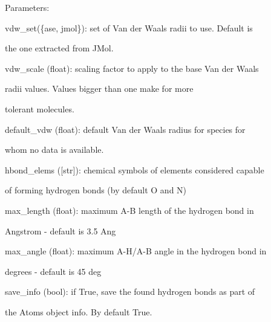 \documentclass[letterpaper,10pt,english]{sphinxmanual}
\begin{document}
\begin{fulllineitems}
\begin{DUlineblock}{0em}
\item[] Parameters:
\item[]
\begin{DUlineblock}{\DUlineblockindent}
\item[] vdw\_set(\{ase, jmol\}): set of Van der Waals radii to use. Default is
\item[]
\begin{DUlineblock}{\DUlineblockindent}
\item[] the one extracted from JMol.
\end{DUlineblock}
\item[] vdw\_scale (float): scaling factor to apply to the base Van der Waals
\item[]
\begin{DUlineblock}{\DUlineblockindent}
\item[] radii values. Values bigger than one make for more
\item[] tolerant molecules.
\end{DUlineblock}
\item[] default\_vdw (float): default Van der Waals radius for species for
\item[]
\begin{DUlineblock}{\DUlineblockindent}
\item[] whom no data is available.
\end{DUlineblock}
\item[] hbond\_elems ({[}str{]}): chemical symbols of elements considered capable
\item[]
\begin{DUlineblock}{\DUlineblockindent}
\item[] of forming hydrogen bonds (by default O and N)
\end{DUlineblock}
\item[] max\_length (float): maximum A-B length of the hydrogen bond in
\item[]
\begin{DUlineblock}{\DUlineblockindent}
\item[] Angstrom - default is 3.5 Ang
\end{DUlineblock}
\item[] max\_angle (float): maximum A-H/A-B angle in the hydrogen bond in
\item[]
\begin{DUlineblock}{\DUlineblockindent}
\item[] degrees - default is 45 deg
\end{DUlineblock}
\item[] save\_info (bool): if True, save the found hydrogen bonds as part of
\item[]
\begin{DUlineblock}{\DUlineblockindent}
\item[] the Atoms object info. By default True.
\end{DUlineblock}
\end{DUlineblock}
\end{DUlineblock}


\end{fulllineitems}
\end{document}
